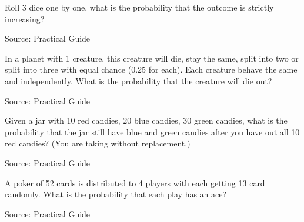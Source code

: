 \begin{exe}
Roll 3 dice one by one, what is the probability that the outcome is strictly increasing?
\end{exe}
Source: Practical Guide
\begin{teacher}
\begin{sol}
\end{sol}
\end{teacher}

\begin{exe}
In a planet with 1 creature, this creature will die, stay the same, split into two or split into three with equal chance (0.25 for each). Each creature behave the same and independently. What is the probability that the creature will die out?
\end{exe}
Source: Practical Guide
\begin{teacher}
\begin{sol}
\end{sol}
\end{teacher}

\begin{exe}
Given a jar with 10 red candies, 20 blue candies, 30 green candies, what is the probability that the jar still have blue and green candies after you have out all 10 red candies? (You are taking without replacement.)

\end{exe}
\begin{teacher}
\begin{sol}
\end{sol}
\end{teacher}

\begin{exe}

\end{exe}
Source: Practical Guide
\begin{teacher}
\begin{sol}
\end{sol}
\end{teacher}

\begin{exe}[Aces]
A poker of 52 cards is distributed to 4 players with each getting 13 card randomly. What is the probability that each play has an ace?
\end{exe}
Source: Practical Guide
\begin{teacher}
\begin{sol}
\end{sol}
\end{teacher}


